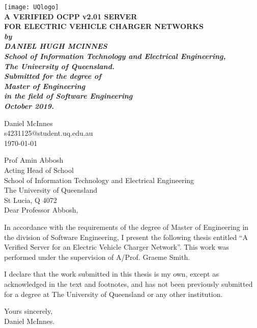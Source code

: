 \documentclass[12pt,openany,a4paper]{book}
\renewcommand{\baselinestretch}{1.2}	%
\begin{document}
\frontmatter

\begin{titlepage}
\renewcommand{\baselinestretch}{1.0}
\begin{center}
\texttt{[image: UQlogo]}\\
\vspace*{35mm}
\Huge\bf
		A VERIFIED OCPP v2.01 SERVER\\
		FOR ELECTRIC VEHICLE CHARGER NETWORKS\\
\vspace{20mm}
\large\sl
		by\\
		DANIEL HUGH MCINNES
		\medskip\\
\rm
		School of Information Technology and Electrical Engineering,\\
		The University of Queensland.\\
\vspace{30mm}
		Submitted for the degree of\\
		Master of Engineering
		\smallskip\\
\normalsize
		in the field of Software Engineering
		\medskip\\
\large
		October 2019.		
\end{center}
\end{titlepage}

\cleardoublepage

\begin{flushright}
	Daniel McInnes\\
	s4231125@student.uq.edu.au\\
	\medskip
	\today
\end{flushright}
\begin{flushleft}
  Prof Amin Abbosh\\
  Acting Head of School\\
  School of Information Technology and Electrical Engineering\\
  The University of Queensland\\
  St Lucia, Q 4072\\
  \bigskip\bigskip
  Dear Professor Abbosh,

\medskip
In accordance with the requirements of the degree of Master of
Engineering in the division of 
Software Engineering,
I present the
following thesis entitled ``A Verified Server for an Electric Vehicle Charger Network''.  This work was performed under the supervision of A/Prof. Graeme Smith.
\medskip

I declare that the work submitted in this thesis is my own, except as
acknowledged in the text and footnotes, and has not been previously
submitted for a degree at The University of Queensland or any other
institution.

	Yours sincerely,\\
	\medskip
	\medskip
	Daniel McInnes.
\end{flushleft}
\end{document}
